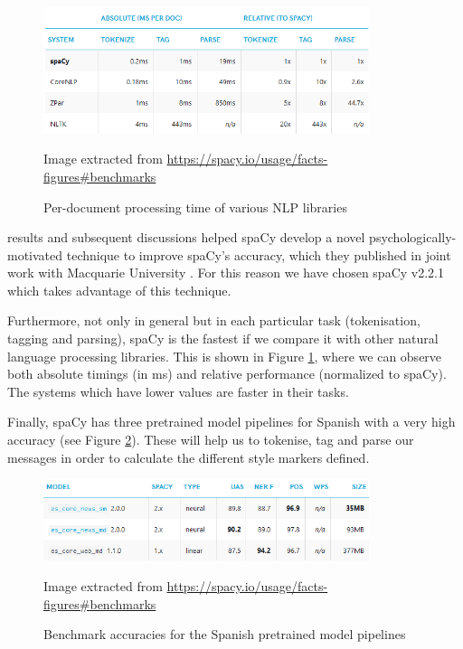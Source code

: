 \begin{figure}[h]
	\centering%
	\includegraphics[width = 0.85\textwidth]{Imagenes/Bitmap/Spacy/spacyspeed.png}%
	\caption{Per-document processing time of various NLP libraries}%
	Image extracted from \url{https://spacy.io/usage/facts-figures#benchmarks}
	\label{fig:spacyspeed}
\end{figure}


\cite{choi2015depends} results and subsequent discussions helped spaCy develop a novel psychologically-motivated technique to improve spaCy's accuracy, which they published in joint work with Macquarie University \citep{honnibal2015improved}. For this reason we have chosen spaCy v2.2.1 which takes advantage of this technique.

Furthermore, not only in general but in each particular task (tokenisation, tagging and parsing), spaCy is the fastest if we compare it with other natural language processing libraries. This is shown in Figure \ref{fig:spacyspeed}, where we can observe both absolute timings (in ms) and relative performance (normalized to spaCy). The systems which have lower values are faster in their tasks.

Finally, spaCy has three pretrained model pipelines for Spanish with a very high accuracy (see Figure \ref{fig:spacymodel}). These will help us to tokenise, tag and parse our messages in order to calculate the different style markers defined.

\begin{figure}[h]
	\centering%
	\includegraphics[width = 0.85\textwidth]{Imagenes/Bitmap/Spacy/spacymodel.png}%
	\caption{Benchmark accuracies for the Spanish pretrained model pipelines}%
	Image extracted from \url{https://spacy.io/usage/facts-figures#benchmarks}
	\label{fig:spacymodel}
\end{figure}

